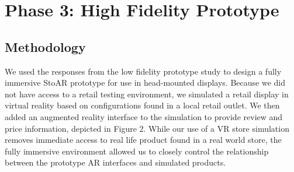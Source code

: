 \section{Phase 3: High Fidelity Prototype}

\subsection{Methodology}
We used the 
responses %
from the low fidelity prototype study to design a fully immersive StoAR prototype for use in head-mounted displays. Because we did not have access to a retail testing environment, we simulated a retail display in virtual reality based on configurations found in a local retail outlet. We then added an augmented reality interface to the simulation to provide review and price information, depicted in Figure 2.  While our use of a VR store simulation removes immediate access to real life product found in a real world store, the fully immersive environment allowed us to closely control the relationship between the prototype AR interfaces and simulated products. %

